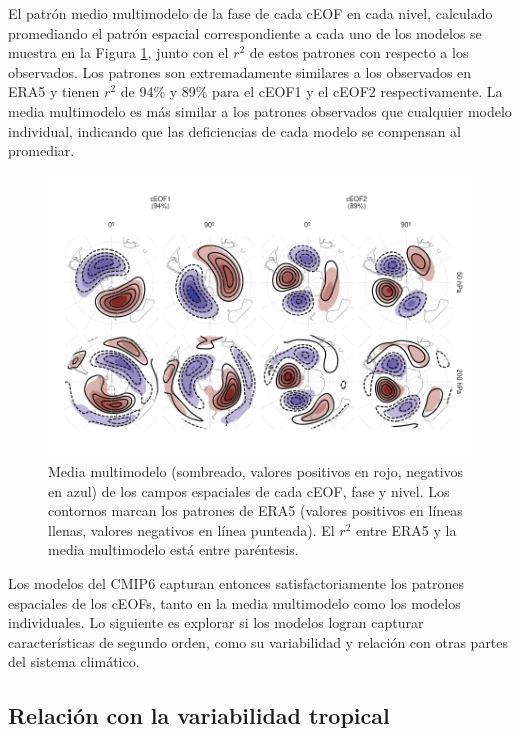 \documentclass[12pt,oneside,a4paper]{reedthesis}
\begin{document}
El patrón medio multimodelo de la fase de cada cEOF en cada nivel, calculado promediando el patrón espacial correspondiente a cada uno de los modelos se muestra en la Figura \ref{fig:mmm}, junto con el \(r^2\) de estos patrones con respecto a los observados.
Los patrones son extremadamente similares a los observados en ERA5 y tienen \(r^2\) de 94\% y 89\% para el cEOF1 y el cEOF2 respectivamente.
La media multimodelo es más similar a los patrones observados que cualquier modelo individual, indicando que las deficiencias de cada modelo se compensan al promediar.

\begin{figure}

{\centering \includegraphics{figures/50-cmip6/mmm-1} 

}

\caption{Media multimodelo (sombreado, valores positivos en rojo, negativos en azul) de los campos espaciales de cada cEOF, fase y nivel. Los contornos marcan los patrones de ERA5 (valores positivos en líneas llenas, valores negativos en línea punteada). El \(r^2\) entre ERA5 y la media multimodelo está entre paréntesis.}\label{fig:mmm}
\end{figure}



Los modelos del CMIP6 capturan entonces satisfactoriamente los patrones espaciales de los cEOFs, tanto en la media multimodelo como los modelos individuales.
Lo siguiente es explorar si los modelos logran capturar características de segundo orden, como su variabilidad y relación con otras partes del sistema climático.

\hypertarget{relaciuxf3n-con-la-variabilidad-tropical}{%
\subsection{Relación con la variabilidad tropical}\label{relaciuxf3n-con-la-variabilidad-tropical}}
\end{document}
